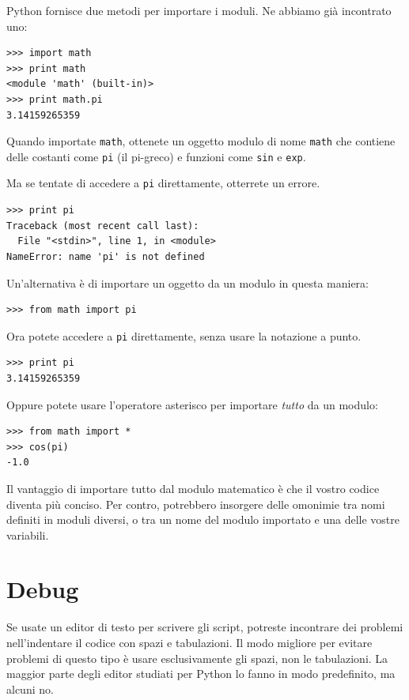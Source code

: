 \documentclass[10pt]{book}
\begin{document}
Python fornisce due metodi per importare i moduli. Ne abbiamo già incontrato uno:

\begin{verbatim}
>>> import math
>>> print math
<module 'math' (built-in)>
>>> print math.pi
3.14159265359
\end{verbatim}
%
Quando importate {\tt math}, ottenete un oggetto modulo di nome {\tt math}
che contiene delle costanti come {\tt pi} (il pi-greco) e funzioni come {\tt sin} e {\tt exp}.

Ma se tentate di accedere a {\tt pi} direttamente, otterrete un errore.

\begin{verbatim}
>>> print pi
Traceback (most recent call last):
  File "<stdin>", line 1, in <module>
NameError: name 'pi' is not defined
\end{verbatim}
%
Un'alternativa è di importare un oggetto da un modulo in questa maniera:

\begin{verbatim}
>>> from math import pi
\end{verbatim}
%
Ora potete accedere a {\tt pi} direttamente, senza usare la notazione a punto.

\begin{verbatim}
>>> print pi
3.14159265359
\end{verbatim}
%
Oppure potete usare l'operatore asterisco per importare {\it tutto} da un modulo:

\begin{verbatim}
>>> from math import *
>>> cos(pi)
-1.0
\end{verbatim}

Il vantaggio di importare tutto dal modulo matematico è che il vostro codice diventa più conciso. Per contro, potrebbero insorgere delle omonimie tra nomi definiti in moduli diversi, o tra un nome del modulo importato e una delle vostre variabili.


\section{Debug}
\label{editor}

Se usate un editor di testo per scrivere gli script, potreste incontrare dei problemi nell'indentare il codice con spazi e tabulazioni. Il modo migliore per evitare problemi di questo tipo è usare esclusivamente gli spazi, non le tabulazioni. La maggior parte degli editor studiati per Python lo fanno in modo predefinito, ma alcuni no.
\end{document}
